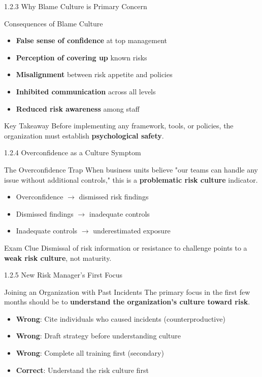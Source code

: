 \documentclass{beamer}
\begin{document}
	\begin{frame}{1.2.3 Why Blame Culture is Primary Concern}
		\begin{block}{Consequences of Blame Culture}
			\begin{itemize}
				\item \textbf{False sense of confidence} at top management
				\item \textbf{Perception of covering up} known risks
				\item \textbf{Misalignment} between risk appetite and policies
				\item \textbf{Inhibited communication} across all levels
				\item \textbf{Reduced risk awareness} among staff
			\end{itemize}
		\end{block}
		\begin{exampleblock}{Key Takeaway}
			Before implementing any framework, tools, or policies, the organization must establish \textbf{psychological safety}.
		\end{exampleblock}
	\end{frame}
	
	\begin{frame}{1.2.4 Overconfidence as a Culture Symptom}
		\begin{block}{The Overconfidence Trap}
			When business units believe "our teams can handle any issue without additional controls," this is a \textbf{problematic risk culture} indicator.
		\end{block}
		\begin{itemize}
			\item Overconfidence $\rightarrow$ dismissed risk findings
			\item Dismissed findings $\rightarrow$ inadequate controls
			\item Inadequate controls $\rightarrow$ underestimated exposure
		\end{itemize}
		\begin{alertblock}{Exam Clue}
			Dismissal of risk information or resistance to challenge points to a \textbf{weak risk culture}, not maturity.
		\end{alertblock}
	\end{frame}
	
	\begin{frame}{1.2.5 New Risk Manager's First Focus}
		\begin{block}{Joining an Organization with Past Incidents}
			The primary focus in the first few months should be to \textbf{understand the organization's culture toward risk}.
		\end{block}
		\begin{itemize}
			\item \textbf{Wrong}: Cite individuals who caused incidents (counterproductive)
			\item \textbf{Wrong}: Draft strategy before understanding culture
			\item \textbf{Wrong}: Complete all training first (secondary)
			\item \textbf{Correct}: Understand the risk culture first
		\end{itemize}
	\end{frame}
	
\end{document}
